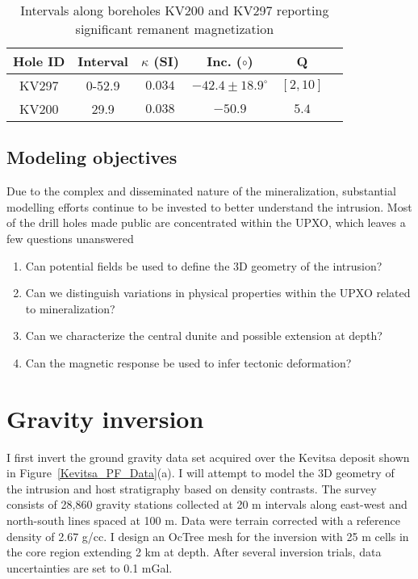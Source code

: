 \begin{table}\centering
\begin{tabular}{|c|c|c|c|c|c|}
\hline
Hole ID & Interval & $\kappa$ (SI) & Inc. ($\circ$) & Q\\
\hline
KV297 & 0-52.9 & $0.034$ & $-42.4\pm 18.9^\circ$&$[2, 10] $\\
\hline
KV200 & 29.9 & $0.038$ & $-50.9$&$ 5.4$\\
\hline
\end{tabular}
\caption{Intervals along boreholes KV200 and KV297 reporting significant remanent magnetization \cite[]{Montonen2012}}
\label{MagCoreSamples}
\end{table}

\subsection{Modeling objectives}
Due to the complex and disseminated nature of the mineralization, substantial modelling efforts continue to be invested to better understand the intrusion. Most of the drill holes made public are concentrated within the UPXO, which leaves a few questions unanswered
\begin{enumerate}
\item Can potential fields be used to define the 3D geometry of the intrusion?
\item Can we distinguish variations in physical properties within the UPXO related to mineralization?
\item Can we characterize the central dunite and possible extension at depth?
\item Can the magnetic response be used to infer tectonic deformation?
\end{enumerate}

\section{Gravity inversion}
I first invert the ground gravity data set acquired over the Kevitsa deposit shown in Figure~\ref{Kevitsa_PF_Data}(a).
I will attempt to model the 3D geometry of the intrusion and host stratigraphy based on density contrasts.
The survey consists of 28,860 gravity stations collected at 20 m intervals along east-west and north-south lines spaced at 100 m. Data were terrain corrected with a reference density of 2.67 g/cc.
I design an OcTree mesh for the inversion with 25 m cells in the core region extending 2 km at depth.
After several inversion trials, data uncertainties are set to 0.1 mGal.

